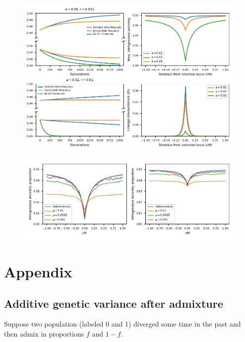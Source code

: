 \documentclass{article}
\begin{document}
\begin{figure}[ht!]
    \centering
    \includegraphics{../figures/linkage_predictions.pdf}
    \caption{
        \textbf{}
    }
    \label{fig:linkage-pred}
\end{figure}

\begin{figure}[ht!]
    \centering
    \includegraphics{../figures/linkage_simulation.pdf}
    \caption{
        \textbf{}
    }
    \label{fig:linkage-sim}
\end{figure}


\clearpage




\section{Appendix}

\subsection{Additive genetic variance after admixture}

Suppose two population (labeled 0 and 1) diverged some time in the past and
then admix in proportions $f$ and $1-f$.
\end{document}

